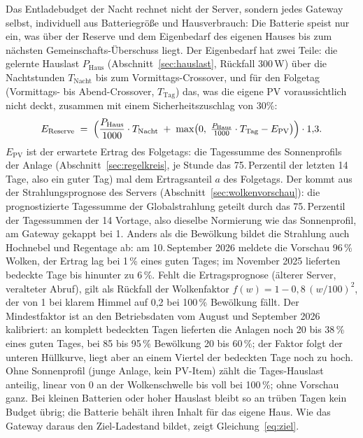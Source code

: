 \documentclass[11pt,a4paper]{article}
\begin{document}
Das Entladebudget der Nacht rechnet nicht der Server, sondern jedes
Gateway selbst, individuell aus Batteriegröße und Hausverbrauch: Die
Batterie speist nur ein, was über der Reserve und dem Eigenbedarf des
eigenen Hauses bis zum nächsten Gemeinschafts-Überschuss liegt. Der
Eigenbedarf hat zwei Teile: die gelernte Hauslast $P_{\text{Haus}}$
(Abschnitt~\ref{sec:hauslast}, Rückfall 300\,W) über die Nachtstunden
$T_{\text{Nacht}}$ bis zum Vormittags-Crossover, und für den Folgetag
(Vormittags- bis Abend-Crossover, $T_{\text{Tag}}$) das, was die eigene PV
voraussichtlich nicht deckt, zusammen mit einem Sicherheitszuschlag von
30\%:
\begin{equation}
  E_{\text{Reserve}} \;=\; \Bigl(\frac{P_{\text{Haus}}}{1000} \cdot T_{\text{Nacht}}
    \;+\; \max\bigl(0,\; \tfrac{P_{\text{Haus}}}{1000} \cdot T_{\text{Tag}} - E_{\text{PV}}\bigr)\Bigr)
    \cdot 1{,}3.
\end{equation}
$E_{\text{PV}}$ ist der erwartete Ertrag des Folgetags: die Tagessumme des
Sonnenprofils der Anlage (Abschnitt~\ref{sec:regelkreis}, je Stunde das
75.\,Perzentil der letzten 14 Tage, also ein guter Tag) mal dem
Ertragsanteil $a$ des Folgetags. Der kommt aus der Strahlungsprognose des
Servers (Abschnitt~\ref{sec:wolkenvorschau}): die prognostizierte
Tagessumme der Globalstrahlung geteilt durch das 75.\,Perzentil der
Tagessummen der 14 Vortage, also dieselbe Normierung wie das Sonnenprofil,
am Gateway gekappt bei 1. Anders als die Bewölkung bildet die Strahlung
auch Hochnebel und Regentage ab: am 10.\,September 2026 meldete die
Vorschau 96\,\% Wolken, der Ertrag lag bei 1\,\% eines guten Tages; im
November 2025 lieferten bedeckte Tage bis hinunter zu 6\,\%. Fehlt die
Ertragsprognose (älterer Server, veralteter Abruf), gilt als Rückfall der
Wolkenfaktor $f(w) = 1 - 0{,}8\,(w/100)^2$, der von 1 bei klarem Himmel
auf 0,2 bei 100\,\% Bewölkung fällt. Der Mindestfaktor ist an den
Betriebsdaten vom August und September 2026 kalibriert: an komplett
bedeckten Tagen lieferten die Anlagen noch 20 bis 38\,\% eines guten
Tages, bei 85 bis 95\,\% Bewölkung 20 bis 60\,\%; der Faktor folgt der
unteren Hüllkurve, liegt aber an einem Viertel der bedeckten Tage noch zu
hoch. Ohne Sonnenprofil (junge Anlage, kein PV-Item) zählt
die Tages-Hauslast anteilig, linear von 0 an der Wolkenschwelle bis voll
bei 100\,\%; ohne Vorschau ganz. Bei kleinen Batterien oder hoher Hauslast
bleibt so an trüben Tagen kein Budget übrig; die Batterie behält ihren
Inhalt für das eigene Haus. Wie das Gateway daraus den Ziel-Ladestand
bildet, zeigt Gleichung~\eqref{eq:ziel}.
\end{document}
